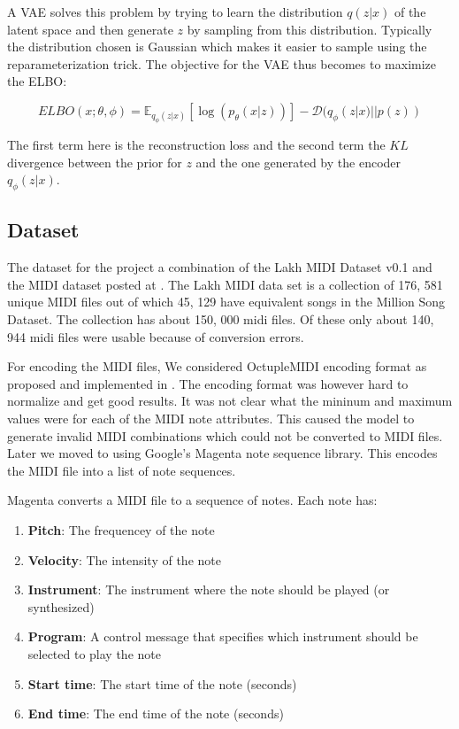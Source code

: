 \documentclass{article}
\begin{document}
A VAE \citep{kingma2014autoencoding} solves this problem by trying to learn the distribution $q(z|x)$ of the latent space and then generate $z$ by sampling from this distribution. Typically the distribution chosen is Gaussian which makes it easier to sample using the reparameterization trick. The objective for the VAE thus becomes to maximize the ELBO:

$$ ELBO(x;\theta, \phi) = \mathbb{E}_{q_{\phi}(z|x)} [ \log(p_{\theta}(x|z))] - \mathcal{D}(q_{\phi}(z|x) || p(z))$$

The first term here is the reconstruction loss and the second term the $KL$ divergence between the prior for $z$ and the one generated by the encoder $q_{\phi} (z|x)$.

\subsection{Dataset}


The dataset for the project a combination of the Lakh MIDI Dataset v0.1 \cite{colinlmd} and the MIDI dataset posted at \citep{midiman}. The Lakh MIDI data set is a collection of 176, 581 unique MIDI files out of which 45, 129 have equivalent songs in the Million Song Dataset. The \citep{midiman} collection has about 150, 000 midi files. Of these only about 140, 944 midi files were usable because of conversion errors. 

For encoding the MIDI files, We considered OctupleMIDI encoding format as proposed and implemented in \cite{zeng2021musicbert}. The encoding format was however hard to normalize and get good results. It was not clear what the mininum and maximum values were for each of the MIDI note attributes. This caused the model to generate invalid MIDI combinations which could not be converted to MIDI  files. Later we moved to using Google's Magenta \citep{magenta} note sequence library. This encodes the MIDI file into a list of note sequences.

Magenta converts a MIDI file to a sequence of notes. Each note has:

\begin{enumerate}
\item \textbf{Pitch}: The frequencey of the note
\item \textbf{Velocity}: The intensity of the note
\item \textbf{Instrument}: The instrument where the note should be played (or synthesized)
\item \textbf{Program}: A control message that specifies which instrument should be selected to play the note
\item \textbf{Start time}: The start time of the note (seconds)
\item \textbf{End time}: The end time of the note (seconds)
\end{enumerate}
\end{document}
